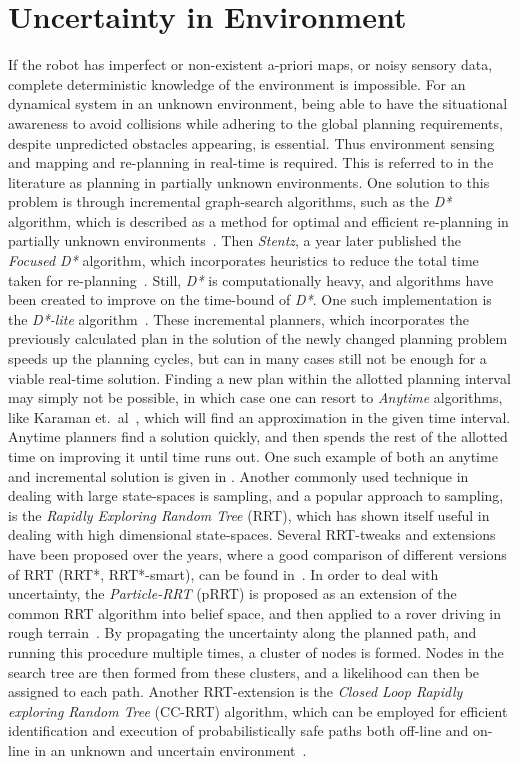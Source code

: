 \section{Uncertainty in Environment}
If the robot has imperfect or non-existent a-priori maps, or noisy sensory data,
complete deterministic knowledge of the environment is impossible. For an
dynamical system in an unknown environment, being able to have the situational
awareness to avoid collisions while adhering to the global planning
requirements, despite unpredicted obstacles appearing, is essential. Thus
environment sensing and mapping and re-planning in real-time is required. This
is referred to in the literature as planning in partially unknown environments.
One solution to this problem is through incremental graph-search algorithms,
such as the \textsl{D*} algorithm, which is described as a method for optimal
and efficient re-planning in partially unknown environments~\cite{Stentz_1997}.
Then \textit{Stentz}, a year later published the \textit{Focused D*} algorithm,
which incorporates heuristics to reduce the total time taken for
re-planning~\cite{Stentz:1995:FDA:1643031.1643113}. Still, \textit{D*} is
computationally heavy, and algorithms have been created to improve on the
time-bound of \textit{D*}. One such implementation is the \textit{D*-lite}
algorithm~\cite{koenig2002d}. These incremental planners, which incorporates the
previously calculated plan in the solution of the newly changed planning problem
speeds up the planning cycles, but can in many cases still not be enough for a
viable real-time solution. Finding a new plan within the allotted planning
interval may simply not be possible, in which case one can resort to
\textit{Anytime} algorithms, like Karaman et.\
al~\cite{karamanAnytimeMotionPlanning2011}, which will find an approximation in
the given time interval. Anytime planners find a solution quickly, and then
spends the rest of the allotted time on improving it until time runs out. One
such example of both an anytime and incremental solution is given in
\textcite{likhachevAnytimeSearchDynamic2008}. Another commonly used technique in
dealing with large state-spaces is sampling, and a popular approach to sampling,
is the \textit{Rapidly Exploring Random Tree} (RRT), which has shown itself
useful in dealing with high dimensional state-spaces. Several RRT-tweaks and
extensions have been proposed over the years, where a good comparison of
different versions of RRT (RRT*, RRT*-smart), can be found
in~\textcite{noreenComparisonRRTRRT2016}. In order to deal with uncertainty, the
\textit{Particle-RRT} (pRRT) is proposed as an extension of the common RRT
algorithm into belief space, and then applied to a rover driving in rough
terrain~\cite{melchiorParticleRRTPath2007}. By propagating the uncertainty along
the planned path, and running this procedure multiple times, a cluster of nodes
is formed. Nodes in the search tree are then formed from these clusters, and a
likelihood can then be assigned to each path. Another RRT-extension is the
\textit{Closed Loop Rapidly exploring Random Tree} (CC-RRT) algorithm, which can
be employed for efficient identification and execution of probabilistically safe
paths both off-line and on-line in an unknown and uncertain
environment~\cite{Luders_2013}.

